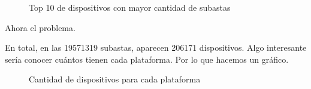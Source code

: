 \documentclass[a4paper, 12pt]{article}
\begin{document}
		\begin{figure}[H]
			\centering
		   	\caption{Top 10 de dispositivos con mayor cantidad de subastas}
			\label{top10devicessubastas}
		\end{figure}


	Ahora el problema.
	
	En total, en las 19571319 subastas, aparecen 206171 dispositivos. Algo interesante sería conocer cuántos tienen cada plataforma. Por lo que hacemos un gráfico.
	 

		\begin{figure}[H]
			\centering
		   	\caption{Cantidad de dispositivos para cada plataforma}
			\label{devicesporSO}
		\end{figure}
\end{document}
